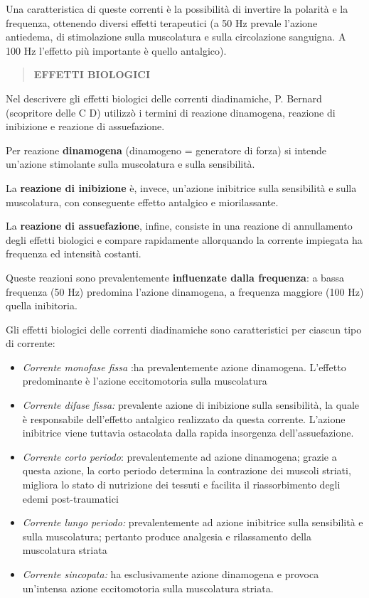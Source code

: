 \documentclass[]{article}
\begin{document}
Una caratteristica di queste correnti è la possibilità di invertire la
polarità e la frequenza, ottenendo diversi effetti terapeutici (a 50 Hz
prevale l'azione antiedema, di stimolazione sulla muscolatura e sulla
circolazione sanguigna. A 100 Hz l'effetto più importante è quello
antalgico).

\begin{quote}
\textbf{EFFETTI BIOLOGICI}
\end{quote}

Nel descrivere gli effetti biologici delle correnti diadinamiche, P.
Bernard (scopritore delle C D) utilizzò i termini di reazione
dinamogena, reazione di inibizione e reazione di assuefazione.

Per reazione \textbf{dinamogena} (dinamogeno = generatore di forza) si
intende un'azione stimolante sulla muscolatura e sulla sensibilità.

La \textbf{reazione di inibizione} è, invece, un'azione inibitrice sulla
sensibilità e sulla muscolatura, con conseguente effetto antalgico e
miorilassante.

La \textbf{reazione di assuefazione}, infine, consiste in una reazione
di annullamento degli effetti biologici e compare rapidamente
allorquando la corrente impiegata ha frequenza ed intensità costanti.

Queste reazioni sono prevalentemente \textbf{influenzate dalla
frequenza}: a bassa frequenza (50 Hz) predomina l'azione dinamogena, a
frequenza maggiore (100 Hz) quella inibitoria.

Gli effetti biologici delle correnti diadinamiche sono caratteristici
per ciascun tipo di corrente:

\begin{itemize}
\item
  \emph{Corrente monofase fissa} :ha prevalentemente azione dinamogena.
  L'effetto predominante è l'azione eccitomotoria sulla muscolatura
\item
  \emph{Corrente difase fissa:} prevalente azione di inibizione sulla
  sensibilità, la quale è responsabile dell'effetto antalgico realizzato
  da questa corrente. L'azione inibitrice viene tuttavia ostacolata
  dalla rapida insorgenza dell'assuefazione.
\item
  \emph{Corrente corto periodo}: prevalentemente ad azione dinamogena;
  grazie a questa azione, la corto periodo determina la contrazione dei
  muscoli striati, migliora lo stato di nutrizione dei tessuti e
  facilita il riassorbimento degli edemi post-traumatici
\item
  \emph{Corrente lungo periodo:} prevalentemente ad azione inibitrice
  sulla sensibilità e sulla muscolatura; pertanto produce analgesia e
  rilassamento della muscolatura striata
\item
  \emph{Corrente sincopata:} ha esclusivamente azione dinamogena e
  provoca un'intensa azione eccitomotoria sulla muscolatura striata.
\end{itemize}
\end{document}
